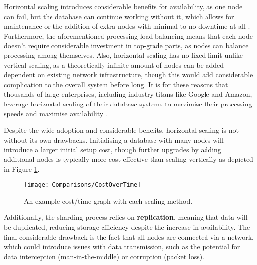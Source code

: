 \para Horizontal scaling introduces considerable benefits for availability, as one node can fail, but the database can continue working 
without it, which allows for maintenance or the addition of extra nodes with minimal to no downtime at all \autocite{mongodbGuideHorizontalVs}.
Furthermore, the aforementioned processing load balancing means that each node doesn't require considerable investment in 
top-grade parts, as nodes can balance processing among themselves. Also, horizontal scaling has no fixed limit unlike vertical scaling, as 
a theoretically infinite amount of nodes can be added dependent on existing network infrastructure, though this would add considerable 
complication to the overall system before long. It is for these reasons that thousands of large enterprises,
including industry titans like Google and Amazon, leverage horizontal scaling of their database systems to maximise their processing speeds
and maximise availability \autocite{changBigtableDistributedStorage2008,amazonModernizingAmazonDatabase2021}. 

\para Despite the wide adoption and considerable benefits, horizontal scaling is not without its own drawbacks. 
Initialising a database with many nodes will introduce a larger initial setup cost, though further upgrades by adding additional nodes 
is typically more cost-effective than scaling vertically as depicted in Figure \ref{fig:ScalingCostOverTime}.

\begin{figure}[H]
    \centering
    \texttt{[image: Comparisons/CostOverTime]}
    \caption{An example cost/time graph with each scaling method. \autocite{mongodbGuideHorizontalVs}\label{fig:ScalingCostOverTime}}
\end{figure}


\noindent Additionally, the sharding process relies on \textbf{replication}, meaning that data will be duplicated, reducing storage efficiency
despite the increase in availability. The final considerable drawback is the fact that all nodes are connected via a network, which could 
introduce issues with data transmission, such as the potential for data interception (man-in-the-middle) or corruption (packet loss).



